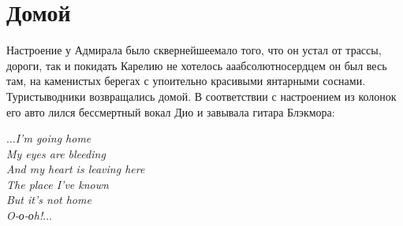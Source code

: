 \chapter{Домой}
\vepsianrose

Настроение у Адмирала было сквернейшее\mdash мало того, что он устал от трассы, дороги, так и покидать Карелию не хотелось а\sdash а\sdash абсолютно\mdash сердцем он был весь там, на каменистых берегах с упоительно красивыми янтарными соснами. Туристы\sdash водники возвращались домой. В соответствии с настроением из колонок его авто лился бессмертный вокал Дио и завывала гитара Блэкмора:

\vspace{0.3cm}
\noindent\textit{%
	\hspace*{3.4cm}$\ldots$I'm going home\\
	\hspace*{3.4cm}My eyes are bleeding\\
	\hspace*{3.4cm}And my heart is leaving here\\
	\hspace*{3.4cm}The place I've known\\
	\hspace*{3.4cm}But it's not home\\
	\hspace*{3.4cm}O-о-оh!$\ldots$\\		
}
\vspace{0.3cm} 

\begin{center}
\end{center}
